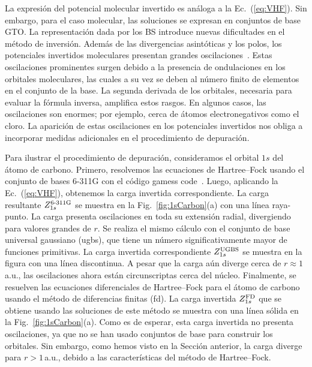 La expresión del potencial molecular invertido es análoga a la 
Ec.~(\ref{eq:VHF}). Sin embargo, para el caso molecular, las soluciones 
se expresan en conjuntos de base GTO. 
%
La representación dada por los BS introduce nuevas dificultades en el 
método de inversión. Además de las divergencias asintóticas y los polos, 
los potenciales invertidos moleculares presentan grandes 
oscilaciones~\cite{Schipper:97,Mura:97,Jacob:11,Gaiduk:13}. Estas 
oscilaciones prominentes surgen debido a la presencia de ondulaciones en 
los orbitales moleculares, las cuales a su vez se deben al número finito 
de elementos en el conjunto de la base. La segunda derivada de los 
orbitales, necesaria para evaluar la fórmula inversa, amplifica estos 
rasgos. En algunos casos, las oscilaciones son enormes; por ejemplo, 
cerca de átomos electronegativos como el cloro. La aparición de estas 
oscilaciones en los potenciales invertidos nos obliga a incorporar 
medidas adicionales en el procedimiento de depuración.

Para ilustrar el procedimiento de depuración, consideramos el orbital 
$1s$ del átomo de carbono. Primero, resolvemos las ecuaciones de 
Hartree--Fock usando el conjunto de bases \mbox{6-311G} con el código 
{\sc gamess} code~\cite{Schmidt:93,Gordon:05}. Luego, aplicando la  
Ec.~(\ref{eq:VHF}), obtenemos la carga invertida correspondiente. La 
carga resultante $Z_{1s}^{\mbox{\scriptsize 6-311G}}$ se muestra en la 
Fig.~\ref{fig:1sCarbon}(a) con una línea raya-punto. La carga presenta 
oscilaciones en toda su extensión radial, divergiendo para valores 
grandes de $r$. Se realiza el mismo cálculo con el conjunto de base 
universal gaussiano (\acs{ugbs}), que tiene un número significativamente 
mayor de funciones primitivas. La carga invertida correspondiente 
$Z_{1s}^{\mbox{\scriptsize UGBS}}$ se muestra en la figura con una línea 
discontinua. A pesar que la carga aún diverge cerca de 
$r\approx1\,$a.u., las oscilaciones ahora están circunscriptas cerca del 
núcleo. Finalmente, se resuelven las ecuaciones diferenciales de 
Hartree--Fock para el átomo de carbono usando el método de diferencias 
finitas (\acs{fd}). La carga invertida $Z_{1s}^{\mbox{\scriptsize FD}}$ 
que se obtiene usando las soluciones de este método se muestra con una 
línea sólida en la Fig.~\ref{fig:1sCarbon}(a). Como es de esperar, esta 
carga invertida no presenta oscilaciones, ya que no se han usado 
conjuntos de base para construir los orbitales. Sin embargo, como hemos 
visto en la Sección anterior, la carga diverge para $r>1\,$a.u., debido 
a las características del método de Hartree--Fock. 

